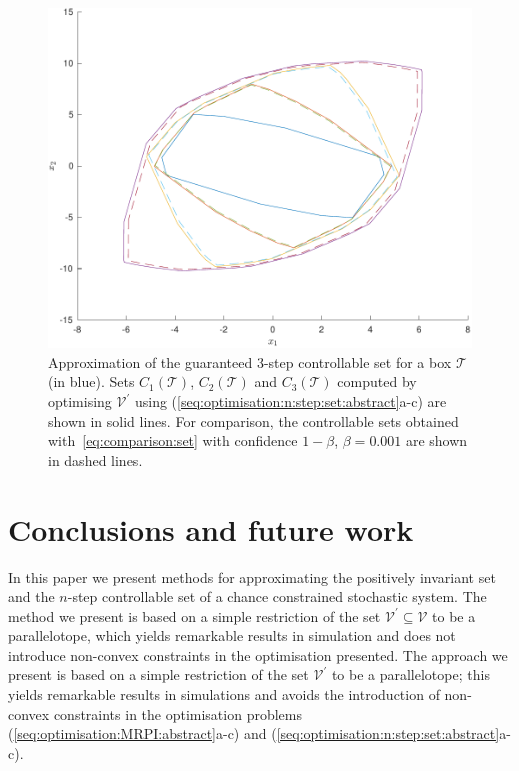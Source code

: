 \documentclass{ifacconf}
\providecommand{\V}{\mathcal V}
\providecommand{\T}{\mathcal T}
\begin{document}
\begin{figure}
\includegraphics[width=.95\linewidth]{NStepSetOptimised.pdf}
\caption{Approximation of the guaranteed 3-step controllable set for a box $\T$ (in blue). Sets $C_1(\T)$, $C_2(\T)$ and $C_3(\T)$ computed by optimising $\V^\prime$ using  (\ref{seq:optimisation:n:step:set:abstract}a-c) are shown in solid lines. For comparison, the controllable sets obtained with~\eqref{eq:comparison:set} with 
confidence $1-\beta$, $\beta = 0.001$ are shown in dashed lines.}
\label{fig:n:step:controllable:set}
\vspace{4mm}\end{figure}



\section{Conclusions and future work}\label{sec:conclusion}
%
%
In this paper we present methods for approximating the positively invariant set and the $n$-step controllable set of a chance constrained stochastic system.
%
The method we present is based on a simple restriction of the set $\V^\prime\subseteq\V$ to be a parallelotope, which yields remarkable results in simulation and does not introduce non-convex constraints in the optimisation presented.
%
The approach we present is based on a simple restriction of the set $\V^\prime$ to be a parallelotope; this yields remarkable results in simulations and avoids the introduction of non-convex constraints in the optimisation problems (\ref{seq:optimisation:MRPI:abstract}a-c) and \mbox{(\ref{seq:optimisation:n:step:set:abstract}a-c)}.
\end{document}
